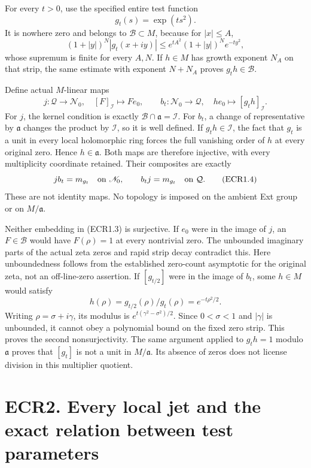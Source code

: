 For every \(t>0\), use the specified entire test function \[
g_t(s)=\exp(t s^2).
\tag{ECR1.1}
\] It is nowhere zero and belongs to \(\mathcal B\subset M\), because
for \(|x|\le A\), \[
(1+|y|)^N|g_t(x+iy)|
\le e^{tA^2}(1+|y|)^N e^{-ty^2},
\tag{ECR1.2}
\] whose supremum is finite for every \(A,N\). If \(h\in M\) has growth
exponent \(N_A\) on that strip, the same estimate with exponent
\(N+N_A\) proves \(g_th\in\mathcal B\).

Define actual \(M\)-linear maps \[
j:\mathcal Q\longrightarrow\mathscr N_0,
\quad [F]_{\mathcal I}\longmapsto F e_0,
\qquad
b_t:\mathscr N_0\longrightarrow\mathcal Q,
\quad h e_0\longmapsto[g_t h]_{\mathcal I}.
\tag{ECR1.3}
\] For \(j\), the kernel condition is exactly
\(\mathcal B\cap\mathfrak a=\mathcal I\). For \(b_t\), a change of
representative by \(\mathfrak a\) changes the product by \(\mathcal I\),
so it is well defined. If \(g_t h\in\mathcal I\), the fact that \(g_t\)
is a unit in every local holomorphic ring forces the full vanishing
order of \(h\) at every original zero. Hence \(h\in\mathfrak a\). Both
maps are therefore injective, with every multiplicity coordinate
retained. Their composites are exactly \[
j b_t=m_{g_t}\quad\hbox{on }\mathscr N_0,
\qquad b_t j=m_{g_t}\quad\hbox{on }\mathcal Q.
\tag{ECR1.4}
\] These are not identity maps. No topology is imposed on the ambient
Ext group or on \(M/\mathfrak a\).

Neither embedding in (ECR1.3) is surjective. If \(e_0\) were in the
image of \(j\), an \(F\in\mathcal B\) would have \(F(\rho)=1\) at every
nontrivial zero. The unbounded imaginary parts of the actual zeta zeros
and rapid strip decay contradict this. Here unboundedness follows from
the established zero-count asymptotic for the original zeta, not an
off-line-zero assertion. If \([g_{t/2}]\) were in the image of \(b_t\),
some \(h\in M\) would satisfy \[
h(\rho)=g_{t/2}(\rho)/g_t(\rho)=e^{-t\rho^2/2}.
\tag{ECR1.5}
\] Writing \(\rho=\sigma+i\gamma\), its modulus is
\(e^{t(\gamma^2-\sigma^2)/2}\). Since \(0<\sigma<1\) and \(|\gamma|\) is
unbounded, it cannot obey a polynomial bound on the fixed zero strip.
This proves the second nonsurjectivity. The same argument applied to
\(g_t h=1\) modulo \(\mathfrak a\) proves that \([g_t]\) is not a unit
in \(M/\mathfrak a\). Its absence of zeros does not license division in
this multiplier quotient.

\section{ECR2. Every local jet and the exact relation between test
parameters}\label{ecr2.-every-local-jet-and-the-exact-relation-between-test-parameters}

